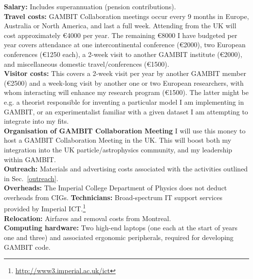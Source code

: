 \documentclass[a4paper,11pt]{article}
\begin{document}
\vspace{3mm}
\noindent \textbf{Salary:} Includes superannuation (pension contributions).\\
\textbf{Travel costs:} GAMBIT Collaboration meetings occur every 9 months in Europe, Australia or North America, and last a full week.  Attending from the UK will cost approximately \euro4000 per year.  The remaining \euro8000 I have budgeted per year covers attendance at one intercontinental conference (\euro2000), two European conferences (\euro1250 each), a 2-week visit to another GAMBIT institute (\euro2000), and miscellaneous domestic travel/conferences (\euro1500).\\
\textbf{Visitor costs:} This covers a 2-week visit per year by another GAMBIT member (\euro2500) and a week-long visit by another one or two European researchers, with whom interacting will enhance my research program (\euro1500).  The latter might be e.g. a theorist responsible for inventing a particular model I am implementing in GAMBIT, or an experimentalist familiar with a given dataset I am attempting to integrate into my fits.\\
\textbf{Organisation of GAMBIT Collaboration Meeting} I will use this money to host a GAMBIT Collaboration Meeting in the UK.  This will boost both my integration into the UK particle/astrophysics community, and my leadership within GAMBIT.\\
\textbf{Outreach:} Materials and advertising costs associated with the activities outlined in Sec.\ \ref{outreach}.\\
\textbf{Overheads:} The Imperial College Department of Physics does not deduct overheads from CIGs.
\textbf{Technicians:} Broad-spectrum IT support services provided by Imperial ICT.\footnote{\href{http://www3.imperial.ac.uk/ict}{http://www3.imperial.ac.uk/ict}}\\
\textbf{Relocation:} Airfares and removal costs from Montreal.\\
\textbf{Computing hardware:} Two high-end laptops (one each at the start of years one and three) and associated ergonomic peripherals, required for developing GAMBIT code.
\end{document}
